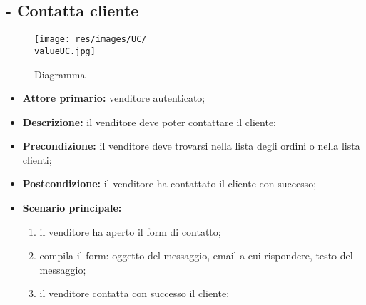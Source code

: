\subsection{ - Contatta cliente}
\begin{figure}[H]
    \centering
    \texttt{[image: res/images/UC/\\valueUC.jpg]}
    \caption{Diagramma }
\end{figure}
\begin{itemize}
    \item \textbf{Attore primario:} venditore autenticato;
    \item \textbf{Descrizione:} il venditore deve poter contattare il cliente;
    \item \textbf{Precondizione:} il venditore deve trovarsi nella lista degli ordini o nella lista clienti;
    \item \textbf{Postcondizione:} il venditore ha contattato il cliente con successo;
    \item \textbf{Scenario principale:}
          \begin{enumerate}
              \item il venditore ha aperto il form di contatto;
              \item compila il form: oggetto del messaggio, email a cui rispondere, testo del messaggio;
              \item il venditore contatta con successo il cliente;
          \end{enumerate}
\end{itemize}

\stepUserCase
